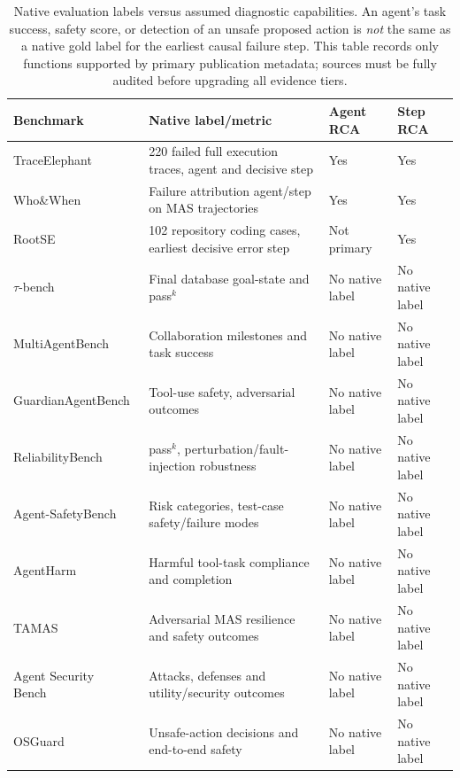 \begin{table}[t]
\centering
\caption{Native evaluation labels versus assumed diagnostic capabilities. An agent's task success, safety score, or detection of an unsafe proposed action is \emph{not} the same as a native gold label for the earliest causal failure step. This table records only functions supported by primary publication metadata; sources must be fully audited before upgrading all evidence tiers.}
\label{tab:benchmarks}
\footnotesize
\begin{tabularx}{\textwidth}{@{}p{}p{}p{}X@{}}
\toprule
\textbf{Benchmark} & \textbf{Native label/metric} & \textbf{Agent RCA} & \textbf{Step RCA} \\
\midrule
TraceElephant~\cite{traceelephant2026} & 220 failed full execution traces, agent and decisive step & Yes & Yes\\
Who\&When~\cite{whenwhen2025} & Failure attribution agent/step on MAS trajectories & Yes & Yes\\
RootSE~\cite{trajaudit2026} & 102 repository coding cases, earliest decisive error step & Not primary & Yes\\
$\tau$-bench~\cite{taubench2024} & Final database goal-state and pass$^k$ & No native label & No native label\\
MultiAgentBench~\cite{multiagentbench2025} & Collaboration milestones and task success & No native label & No native label\\
GuardianAgentBench~\cite{guardianagentbench2026} & Tool-use safety, adversarial outcomes & No native label & No native label\\
ReliabilityBench~\cite{reliabilitybench2026} & pass$^k$, perturbation/fault-injection robustness & No native label & No native label\\
Agent-SafetyBench~\cite{agentsafetybench2024} & Risk categories, test-case safety/failure modes & No native label & No native label\\
AgentHarm~\cite{agentharm2024} & Harmful tool-task compliance and completion & No native label & No native label\\
TAMAS~\cite{tamas2026} & Adversarial MAS resilience and safety outcomes & No native label & No native label\\
Agent Security Bench~\cite{asb2025} & Attacks, defenses and utility/security outcomes & No native label & No native label\\
OSGuard~\cite{osguard2026} & Unsafe-action decisions and end-to-end safety & No native label & No native label\\
\bottomrule
\end{tabularx}
\end{table}

